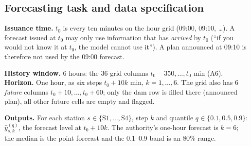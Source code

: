 \subsection{Forecasting task and data specification}

\textbf{Issuance time.} $t_0$ is every ten minutes on the hour grid (09:00, 09:10, \dots). A forecast issued at $t_0$ may only use information that has \emph{arrived} by $t_0$ (``if you would not know it at $t_0$, the model cannot use it''). A plan announced at 09:10 is therefore not used by the 09:00 forecast.

\textbf{History window.} 6 hours: the 36 grid columns $t_0-350,\dots,t_0$ min (A6). \textbf{Horizon.} One hour, as six steps $t_0+10k$ min, $k=1,\dots,6$. The grid also has 6 \emph{future} columns $t_0+10,\dots,t_0+60$; only the dam row is filled there (announced plan), all other future cells are empty and flagged.

\textbf{Outputs.} For each station $s\in\{\text{S1},\dots,\text{S4}\}$, step $k$ and quantile $q\in\{0.1,0.5,0.9\}$: $\hat y^{(q)}_{s,k}$, the forecast level at $t_0+10k$. The authority's one-hour forecast is $k=6$; the median is the point forecast and the 0.1--0.9 band is an 80\% range.

